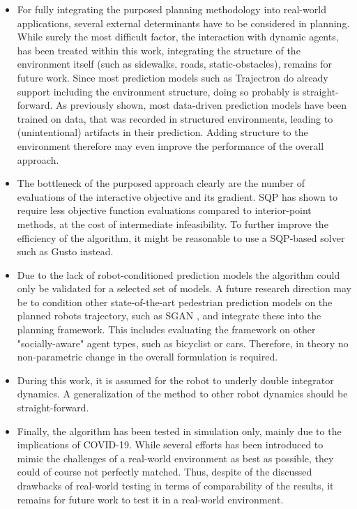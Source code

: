 \begin{itemize}
\item For fully integrating the purposed planning methodology into real-world applications, several external determinants have to be considered in planning. While surely the most difficult factor, the interaction with dynamic agents, has been treated within this work, integrating the structure of the environment itself (such as sidewalks, roads, static-obstacles), remains for future work. Since most prediction models such as Trajectron \cite{Salzmann2020} do already support including the environment structure, doing so probably is straight-forward. As previously shown, most data-driven prediction models have been trained on data, that was recorded in structured environments, leading to (unintentional) artifacts in their prediction. Adding structure to the environment therefore may even improve the performance of the overall approach.
\item The bottleneck of the purposed approach clearly are the number of evaluations of the interactive objective and its gradient. \ac{SQP} has shown to require less objective function evaluations compared to interior-point methods, at the cost of intermediate infeasibility. To further improve the efficiency of the algorithm, it might be reasonable to use a \ac{SQP}-based solver such as Gusto \cite{Bonalli2019} instead.
\item Due to the lack of robot-conditioned prediction models the algorithm could only be validated for a selected set of models. A future research direction may be to condition other state-of-the-art pedestrian prediction models on the planned robots trajectory, such as \ac{SGAN} \cite{Gupta2018}, and integrate these into the planning framework. This includes evaluating the framework on other "socially-aware" agent types, such as  bicyclist or cars. Therefore, in theory no non-parametric change in the overall formulation is required.
\item During this work, it is assumed for the robot to underly double integrator dynamics. A generalization of the method to other robot dynamics should be straight-forward.
\item Finally, the algorithm has been tested in simulation only, mainly due to the implications of COVID-19. While several efforts has been introduced to mimic the challenges of a real-world environment as best as possible, they could of course not perfectly matched. Thus, despite of the discussed drawbacks of real-world testing in terms of comparability of the results, it remains for future work to test it in a real-world environment.  
\end{itemize}

